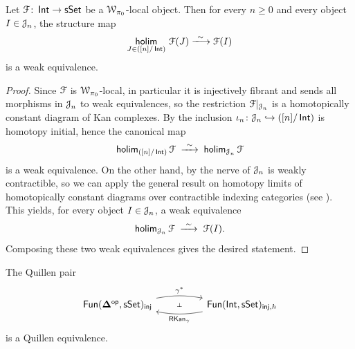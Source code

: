 \begin{proposition}\label{ch2:: prop: structure_maps_weak_equivalences}
    Let $\mathcal F\colon \operatorname{\mathsf{Int}} \to \operatorname{\sf sSet}$ be a $\mathcal W_{\pi_{0}}$-local object. Then for every $n\geq 0$ and every object $I\in \mathcal J_{n}$, the structure map
    \begin{equation}
        \underset{J\in ([n]/\Int)}{\mathsf{holim}} \,\, \cF(J) \xlongrightarrow{\ \sim\ } \cF(I)
    \end{equation}
    is a weak equivalence.
\end{proposition}

\begin{proof}
    Since $\mathcal F$ is $\mathcal W_{\pi_0}$-local, in particular it is injectively fibrant and sends all morphisms in $\mathcal J_n$ to weak equivalences, so the restriction $\mathcal F|_{\mathcal J_n}$ is a homotopically constant diagram of Kan complexes. By  the inclusion $\iota_n\colon \mathcal J_n \hookrightarrow ([n]/\operatorname{\mathsf{Int}})$ is homotopy initial, hence the canonical map
    \[
      \holim_{([n]/\Int)} \cF \;\xrightarrow{\ \sim\;}\; \holim_{\cJ_n} \cF
    \]
    is a weak equivalence. On the other hand, by  the nerve of $\mathcal J_n$ is weakly contractible, so we can apply the general result on homotopy limits of homotopically constant diagrams over contractible indexing categories (see ). This yields, for every object $I\in \mathcal J_n$, a weak equivalence
    \[
      \operatorname{\sf holim}_{\mathcal J_n} \mathcal F \;\xrightarrow{\ \sim\;}\; \mathcal F(I).
    \]
    Composing these two weak equivalences gives the desired statement.
\end{proof}

\begin{theorem}
    The Quillen pair 
    \begin{equation}
    \begin{tikzcd}[ampersand replacement=\&]
	{\fun(\bDelta^{\op},\sset)_{\mathsf{inj}}} \&\& {\fun(\Int,\sset)_{\mathsf{inj},h}}
	\arrow[""{name=0, anchor=center, inner sep=0}, "{\gamma^*}", bend left=10, from=1-1, to=1-3]
	\arrow[""{name=1, anchor=center, inner sep=0}, "{\rkan_{\gamma}}", bend left=10, from=1-3, to=1-1]
	\arrow["\dashv"{anchor=center, rotate=-90}, draw=none, from=1, to=0]
    \end{tikzcd}
    \end{equation}
    is a Quillen equivalence.
\end{theorem}

